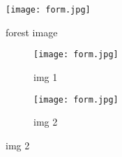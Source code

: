 \documentclass{article}
\begin{document}
	
	
	\begin{figure}
		\centering
		\texttt{[image: form.jpg]}
		\caption{forest image}
		\label{fig 1}
	\end{figure}
	
	\begin{figure}[h]
		
		\begin{subfigure}{0.5\textwidth}
			\texttt{[image: form.jpg]}
			\caption{img 1}
		\end{subfigure}
	\hfill
	\begin{subfigure}{0.5\textwidth}
		\texttt{[image: form.jpg]}
		\caption{img 2}
	\end{subfigure}
	\end{figure}

	
	
	
	
\end{document}
